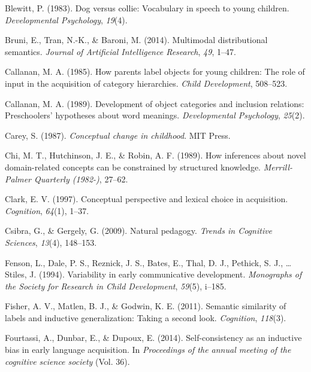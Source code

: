 \documentclass[english,,man,floatsintext]{apa6}
\begin{document}
\leavevmode\hypertarget{ref-blewitt1983}{}%
Blewitt, P. (1983). Dog versus collie: Vocabulary in speech to young children. \emph{Developmental Psychology}, \emph{19}(4).

\leavevmode\hypertarget{ref-bruni2014}{}%
Bruni, E., Tran, N.-K., \& Baroni, M. (2014). Multimodal distributional semantics. \emph{Journal of Artificial Intelligence Research}, \emph{49}, 1--47.

\leavevmode\hypertarget{ref-callanan1985}{}%
Callanan, M. A. (1985). How parents label objects for young children: The role of input in the acquisition of category hierarchies. \emph{Child Development}, 508--523.

\leavevmode\hypertarget{ref-callanan1989}{}%
Callanan, M. A. (1989). Development of object categories and inclusion relations: Preschoolers' hypotheses about word meanings. \emph{Developmental Psychology}, \emph{25}(2).

\leavevmode\hypertarget{ref-carey1987}{}%
Carey, S. (1987). \emph{Conceptual change in childhood}. MIT Press.

\leavevmode\hypertarget{ref-chi1989}{}%
Chi, M. T., Hutchinson, J. E., \& Robin, A. F. (1989). How inferences about novel domain-related concepts can be constrained by structured knowledge. \emph{Merrill-Palmer Quarterly (1982-)}, 27--62.

\leavevmode\hypertarget{ref-clark1997}{}%
Clark, E. V. (1997). Conceptual perspective and lexical choice in acquisition. \emph{Cognition}, \emph{64}(1), 1--37.

\leavevmode\hypertarget{ref-csibra2009}{}%
Csibra, G., \& Gergely, G. (2009). Natural pedagogy. \emph{Trends in Cognitive Sciences}, \emph{13}(4), 148--153.

\leavevmode\hypertarget{ref-fenson94}{}%
Fenson, L., Dale, P. S., Reznick, J. S., Bates, E., Thal, D. J., Pethick, S. J., \ldots{} Stiles, J. (1994). Variability in early communicative development. \emph{Monographs of the Society for Research in Child Development}, \emph{59}(5), i--185.

\leavevmode\hypertarget{ref-fisher2011}{}%
Fisher, A. V., Matlen, B. J., \& Godwin, K. E. (2011). Semantic similarity of labels and inductive generalization: Taking a second look. \emph{Cognition}, \emph{118}(3).

\leavevmode\hypertarget{ref-fourtassi2014}{}%
Fourtassi, A., Dunbar, E., \& Dupoux, E. (2014). Self-consistency as an inductive bias in early language acquisition. In \emph{Proceedings of the annual meeting of the cognitive science society} (Vol. 36).
\end{document}

